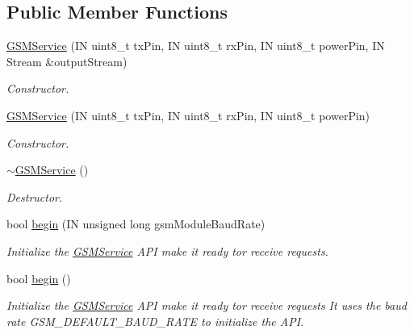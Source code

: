 \subsection*{Public Member Functions}
\begin{DoxyCompactItemize}
\item 
\hyperlink{class_easyuino_1_1_g_s_m_service_ad8700c921a8f3ce267369e9843853be1}{G\+S\+M\+Service} (IN uint8\+\_\+t tx\+Pin, IN uint8\+\_\+t rx\+Pin, IN uint8\+\_\+t power\+Pin, IN Stream \&output\+Stream)
\begin{DoxyCompactList}\small\item\em Constructor. \end{DoxyCompactList}\item 
\hyperlink{class_easyuino_1_1_g_s_m_service_ab856f1ecdb47de6b13f186bea7c69ce2}{G\+S\+M\+Service} (IN uint8\+\_\+t tx\+Pin, IN uint8\+\_\+t rx\+Pin, IN uint8\+\_\+t power\+Pin)
\begin{DoxyCompactList}\small\item\em Constructor. \end{DoxyCompactList}\item 
\mbox{\label{class_easyuino_1_1_g_s_m_service_afacd5511768214c79ae02dc16b07e32f}} 
\hyperlink{class_easyuino_1_1_g_s_m_service_afacd5511768214c79ae02dc16b07e32f}{$\sim$\+G\+S\+M\+Service} ()
\begin{DoxyCompactList}\small\item\em Destructor. \end{DoxyCompactList}\item 
bool \hyperlink{class_easyuino_1_1_g_s_m_service_a49dd695dba030b168464f620c3d96ee0}{begin} (IN unsigned long gsm\+Module\+Baud\+Rate)
\begin{DoxyCompactList}\small\item\em Initialize the \hyperlink{class_easyuino_1_1_g_s_m_service}{G\+S\+M\+Service} A\+PI make it ready tor receive requests. \end{DoxyCompactList}\item 
bool \hyperlink{class_easyuino_1_1_g_s_m_service_aeafc2dae47e4b13e127eb228a0f7ff6a}{begin} ()
\begin{DoxyCompactList}\small\item\em Initialize the \hyperlink{class_easyuino_1_1_g_s_m_service}{G\+S\+M\+Service} A\+PI make it ready tor receive requests It uses the baud rate G\+S\+M\+\_\+\+D\+E\+F\+A\+U\+L\+T\+\_\+\+B\+A\+U\+D\+\_\+\+R\+A\+TE to initialize the A\+PI. \end{DoxyCompactList}\item 

\end{DoxyCompactItemize}
